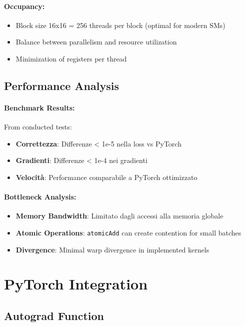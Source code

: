 \documentclass[a4paper,11pt]{article}
\begin{document}
\paragraph{Occupancy:}
\begin{itemize}
    \item Block size 16x16 = 256 threads per block (optimal for modern SMs)
    \item Balance between parallelism and resource utilization
    \item Minimization of registers per thread
\end{itemize}

\subsection{Performance Analysis}

\paragraph{Benchmark Results:}
From conducted tests:
\begin{itemize}
    \item \textbf{Correttezza}: Differenze < 1e-5 nella loss vs PyTorch
    \item \textbf{Gradienti}: Differenze < 1e-4 nei gradienti
    \item \textbf{Velocità}: Performance comparabile a PyTorch ottimizzato
\end{itemize}

\paragraph{Bottleneck Analysis:}
\begin{itemize}
    \item \textbf{Memory Bandwidth}: Limitato dagli accessi alla memoria globale
    \item \textbf{Atomic Operations}: \texttt{atomicAdd} can create contention for small batches
    \item \textbf{Divergence}: Minimal warp divergence in implemented kernels
\end{itemize}

\section{PyTorch Integration}

\subsection{Autograd Function}
\end{document}
